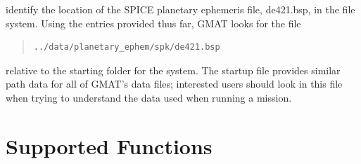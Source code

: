 \documentclass[letterpaper,10pt]{article}
\begin{document}
\noindent identify the location of the SPICE planetary ephemeris file, de421.bsp, in the file system.  Using the entries provided thus far, GMAT looks for the file

\begin{quote}
\begin{verbatim}
../data/planetary_ephem/spk/de421.bsp
\end{verbatim}
\end{quote}

\noindent relative to the starting folder for the system.  The startup file provides similar path data for all of GMAT's data files; interested users should look in this file when trying to understand the data used when running a mission.

\section{\label{sec:FunctionList}Supported Functions}
\end{document}
